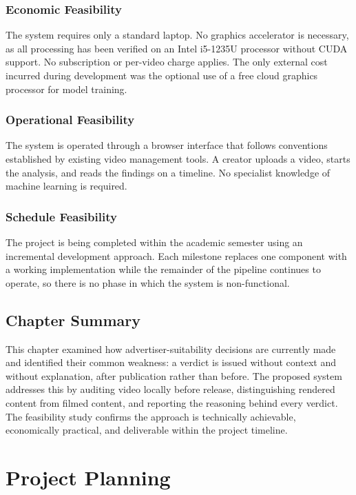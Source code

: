 \documentclass[12pt,a4paper,twoside]{report}
\begin{document}
\subsection{Economic Feasibility}

The system requires only a standard laptop. No graphics accelerator is necessary, as all processing has been verified on an Intel i5-1235U processor without CUDA support. No subscription or per-video charge applies. The only external cost incurred during development was the optional use of a free cloud graphics processor for model training.

\subsection{Operational Feasibility}

The system is operated through a browser interface that follows conventions established by existing video management tools. A creator uploads a video, starts the analysis, and reads the findings on a timeline. No specialist knowledge of machine learning is required.

\subsection{Schedule Feasibility}

The project is being completed within the academic semester using an incremental development approach. Each milestone replaces one component with a working implementation while the remainder of the pipeline continues to operate, so there is no phase in which the system is non-functional.

\section{Chapter Summary}

This chapter examined how advertiser-suitability decisions are currently made and identified their common weakness: a verdict is issued without context and without explanation, after publication rather than before. The proposed system addresses this by auditing video locally before release, distinguishing rendered content from filmed content, and reporting the reasoning behind every verdict. The feasibility study confirms the approach is technically achievable, economically practical, and deliverable within the project timeline.

\chapter{Project Planning}
\end{document}
